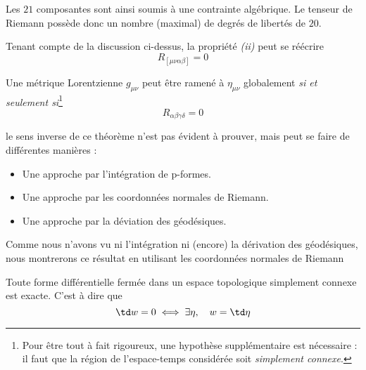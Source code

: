 Les $21$ composantes sont ainsi soumis à une contrainte algébrique. Le tenseur de Riemann possède donc un nombre (maximal) de degrés de libertés de $20$. 
\begin{rmk}
    Tenant compte de la discussion ci-dessus, la propriété \emph{(ii)} peut se réécrire 
    \begin{equation}
        R_{[\mu\nu\alpha\beta]} = 0
    \end{equation}
\end{rmk}

\begin{theoremframe}
    \begin{theorem}
        Une métrique Lorentzienne $g_{\mu \nu}$ peut être ramené à $\eta_{\mu \nu}$ globalement \emph{si et seulement si}\footnote{Pour être tout à fait rigoureux, une hypothèse supplémentaire est nécessaire : il faut que la région de l'espace-temps considérée soit \emph{simplement connexe}.} 
        \begin{equation}
            R_{\alpha \beta \gamma \delta} =0
        \end{equation}
    \end{theorem}
\end{theoremframe}
le sens inverse de ce théorème n'est pas évident à prouver, mais peut se faire de différentes manières :
\begin{itemize}
    \item Une approche par l'intégration de p-formes.
    \item Une approche par les coordonnées normales de Riemann.
    \item Une approche par la déviation des géodésiques.
\end{itemize}
Comme nous n'avons vu ni l'intégration ni (encore) la dérivation des géodésiques, nous montrerons ce résultat en utilisant les coordonnées normales de Riemann
\begin{lemme}
    Toute forme différentielle fermée dans un espace topologique simplement connexe est exacte. C'est à dire que 
    \begin{equation*}
        \td w = 0 \iff \exists \eta, \quad w = \td \eta
    \end{equation*}
\end{lemme}
